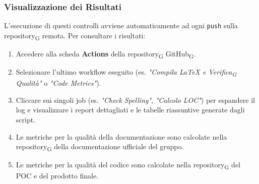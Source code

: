 \documentclass[11pt,a4paper]{article}
\newcommand{\gls}[1]{#1\textsubscript{G}}
\begin{document}
\subsubsection{Visualizzazione dei Risultati}
L'esecuzione di questi controlli avviene automaticamente ad ogni \texttt{push} sulla \gls{repository} remota. Per consultare i risultati:
\begin{enumerate}
    \item Accedere alla scheda \textbf{Actions} della \gls{repository} \gls{GitHub}.
    \item Selezionare l'ultimo workflow eseguito (es. \textit{"Compila LaTeX e \gls{Verifica} Qualità"} o \textit{"Code Metrics"}).
    \item Cliccare sui singoli job (es. \textit{"Check Spelling"}, \textit{"Calcolo LOC"}) per espandere il log e visualizzare i report dettagliati e le tabelle riassuntive generate dagli script.
    \item Le metriche per la qualità della documentazione sono calcolate nella \gls{repository} della documentazione ufficiale del gruppo.
    \item Le metriche per la qualità del codice sono calcolate nella \gls{repository} del POC e del prodotto finale.
\end{enumerate}
\end{document}

